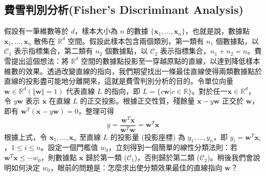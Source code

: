 \documentclass[12pt, a4paper]{article}
\begin{document}
\subsection{費雪判別分析(Fisher's Discriminant Analysis)}
假設有一筆維數等於 $d$，樣本大小為 $n$ 的數據 $\{\mathbf{x}_1,\ldots,\mathbf{x}_n\}$，也就是說，數據點 $\mathbf{x}_1,\ldots,\mathbf{x}_n$ 散佈在 $\mathbb{R}^d$ 空間。假設此樣本包含兩個類別，第一類有 $n_1$ 個數據點，以 $\mathcal{C}_1$ 表示指標集合，第二類有 $n_2$ 個數據點，以 $\mathcal{C}_2$ 表示指標集合，$n_1+n_2=n$。費雪提出這個想法：將 $\mathbb{R}^d$ 空間的數據點投影至一穿越原點的直線，以達到降低樣本維數的效果。透過改變直線的指向，我們期望找出一條最佳直線使得兩類數據點於直線的投影盡可能地分離開來，這就是費雪判別分析的目的。令單位向量 $\mathbf{w}\in\mathbb{R}^d (\Vert\mathbf{w}\Vert=1)$ 代表直線 $L$ 的指向，即 $L=\{c\mathbf{w}\vert c\in\mathbb{R}\}$。對於任一$\mathbf{x}\in\mathbb{R}^d$，令 $y\mathbf{w}$ 表示 $\mathbf{x}$ 在直線 $L$ 的正交投影。根據正交性質，殘餘量 $\mathbf{x}-y\mathbf{w}$ 正交於 $\mathbf{w}$，即有 $\mathbf{w}^T(\mathbf{x}-y\mathbf{w})=0$，整理可得
$$\displaystyle  y=\frac{\mathbf{w}^T\mathbf{x}}{\mathbf{w}^T\mathbf{w}}=\mathbf{w}^T\mathbf{x}$$
根據上式，令 $\mathbf{x}_1,\ldots,\mathbf{x}_n$ 至直線 $L$ 的投影量 (投影座標) 為 $y_1,\ldots,y_n$，即 $y_i=\mathbf{w}^T\mathbf{x}_i$，$1\le i\le n$。設定一個門檻值 $w_0$，立刻得到一個簡單的線性分類法則：若 $\mathbf{w}^T\mathbf{x}\le-w_0$，則數據點 $\mathbf{x}$ 歸於第一類 ($\mathcal{C}_1$)，否則歸於第二類 ($\mathcal{C}_2$)。稍後我們會說明如何決定 $w_0$，眼前的問題是：怎麼求出使分類效果最佳的直線指向 $\mathbf{w}$？
\end{document}
